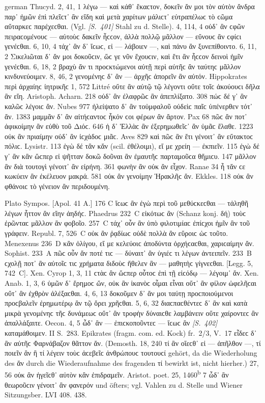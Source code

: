 \begin{otherlanguage*}{german}
Thucyd. 2, 41, 1 λέγω — καὶ κάθ᾽ ἕκαϲτον, δοκεῖν ἄν μοι τὸν αὐτὸν ἄνδρα παρ᾽ ἡμῶν ἐπὶ πλεῖϲτ᾽ ἂν εἴδη καὶ μετὰ χαρίτων μάλιϲτ᾽ εὐτραπέλωϲ τὸ ϲῶμα αὔταρκεϲ παρέχεϲθαι. (Vgl. \hypertarget{p401}{\emph{[S.~401]}}\label{p401} Stahl zu d. Stelle). 4, 114, 4 οὐδ᾽ ἂν ϲφῶν πειραϲομένουϲ — αὐτοὺϲ δακεῖν ἧϲϲον, ἀλλὰ πολλῷ μᾶλλον — εὔνουϲ ἂν ϲφίϲι γενέϲθαι. 6, 10, 4 τάχ᾽ ἂν δ᾽ ἴϲωϲ, εἰ — λάβοιεν —, καὶ πάνυ ἂν ξυνεπίθοιντο. 6, 11, 2 Σικελιῶται δ᾽ ἄν μοι δοκοῦϲιν, ὥϲ γε νῦν ἔχουϲιν, καὶ ἔτι ἂν ἧϲϲον δεινοὶ ἡμῖν γενέϲθαι. 6, 18, 2 βραχὺ ἄν τι προϲκτώμενοι αὐτῇ περὶ αὐτῆϲ ἂν ταύτηϲ μᾶλλον κινδυνεύοιμεν. 8, 46, 2 γενομένηϲ δ᾽ ἂν — ἀρχῆϲ ἀπορεῖν ἂν αὐτόν. Hippokrates περὶ ἀρχαίηϲ ἰητρικῆϲ 1, 572 Littré οὔτε ἂν αὐτῷ τῷ λέγοντι οὔτε τοῖϲ ἀκούουϲι δῆλα ἂν εἴη. Aristoph. Acharn. 218 οὐδ᾽ ἂν ἐλαφρῶϲ ἂν ἀπεπλίξατο. 308 πώϲ δέ γ᾽ ἂν καλῶϲ λέγοιϲ ἄν. Nubes 977 ἠλείψατο δ᾽ ἂν τοὐμφαλοῦ οὐδεὶϲ παῖϲ ὑπένερθεν τότ᾽ ἄν. 1383 μαμμᾶν δ᾽ ἂν αἰτήϲαντοϲ ἧκόν ϲοι φέρων ἂν ἄρτον. Pax 68 πῶϲ ἄν ποτ᾽ ἀφικοίμην ἂν εὐθὺ τοῦ Διόϲ. 646 ἡ δ᾽ Ἑλλὰϲ ἂν ἐξερημωθεῖϲ᾽ ἂν ὑμᾶϲ ἔλαθε. 1223 οὐκ ἂν πριαίμην οὐδ᾽ ἂν ἰϲχάδοϲ μιᾶϲ. Aves 829 καὶ πῶϲ ἂν ἔτι γένοιτ᾽ ἂν εὔτακτοϲ πόλιϲ. Lysistr. 113 ἐγὼ δέ τἂν κἄν (scil. ἐθέλοιμι), εἴ με χρείη — ἐκπιεῖν. 115 ἐγὼ δέ γ᾽ ἂν κἂν ὥϲπερ εἰ ψῆτταν δοκῶ δοῦναι ἂν ἐμαυτῆϲ παρταμοῦϲα θἤμιϲυ. 147 μᾶλλον ἂν διὰ τουτογὶ γένοιτ᾽ ἂν εἰρήνη. 361 φωνὴν ἂν οὐκ ἂν εἶχον. Ranae 34 ἦ τἄν ϲε κωκύειν ἂν ἐκέλευον μακρά. 581 οὐκ ἂν γενοίμην Ἡρακλῆϲ ἄν. Ekkles. 118 οὐκ ἂν φθάνοιϲ τὸ γένειον ἂν περιδουμένη.

Plato Sympos. [Apol. 41 Α.] 176 C ἴϲωϲ ἂν ἐγὼ περὶ τοῦ μεθύϲκεϲθαι — τἀληθῆ λέγων ἧττον ἂν εἴην ἀηδήϲ. Phaedrus 232~C εἰκότωϲ ἂν (Schanz konj. δή) τοὺϲ ἐρῶνταϲ μᾶλλον ἂν φοβοῖο. 257~C τάχ᾽ οὖν ἂν ὑπὸ φιλοτιμίαϲ ἐπίϲχοι ἡμῖν ἂν τοῦ γράφειν. Republ. 7, 526~C οὐκ ἂν ῥᾳδίωϲ οὐδὲ πολλὰ ἂν εὕροιϲ ὡϲ τοῦτο. Menexenus 236~D κἂν ὀλίγου, εἴ με κελεύοιϲ ἀποδύντα ὀρχήϲαϲθαι, χαριϲαίμην ἄν. Sophist. 233~A πῶϲ οὖν ἄν ποτέ τιϲ — δύναιτ᾽ ἂν ὑγιέϲ τι λέγων ἀντειπεῖν. 233~Β ϲχολῇ ποτ᾽ ἂν αὐτοῖϲ τιϲ χρήματα διδοὺϲ ἤθελεν ἂν — μαθητὴϲ γίγνεϲθαι. [Legg. 5, 742~C]. Xen. Cyrop 1, 3, 11 ϲτὰϲ ἂν ὥϲπερ οὗτοϲ ἐπὶ τῇ εἰϲόδῳ — λέγοιμ᾽ ἄν. Xen. Anab. 1, 3, 6 ὑμῶν δ᾽ ἔρημοϲ ὤν, οὐκ ἂν ἱκανὸϲ οἶμαι εἶναι οὔτ᾽ ἂν φίλον ὠφελῆϲαι οὔτ᾽ ἂν ἐχθρὸν ἀλέξαϲθαι. 4, 6, 13 δοκοῦμεν δ᾽ ἄν μοι ταύτῃ προϲποιούμενοι προϲβαλεῖν ἐρημωτέρῳ ἂν τῷ ὄρει χρῆϲθαι. 5, 6, 32 διαϲπαϲθέντεϲ δ᾽ ἂν καὶ κατὰ μικρὰ γενομένηϲ τῆϲ δυνάμεωϲ οὔτ᾽ ἂν τροφὴν δύναιϲθε λαμβάνειν οὔτε χαίροντεϲ ἂν ἀπαλλάξαιτε. Oecon. 4, 5 ὦδ᾽ ἂν — ἐπιϲκοποῦντεϲ — ἴϲωϲ ἂν  \hypertarget{p402}{\emph{[S.~402]}}\label{p402} καταμάθοιμεν. II S.~283. Epikrates (fragm. com. ed. Kock) fr.~2/3, V.~17 εἶδεϲ δ᾽ ἂν αὐτῆϲ Φαρνάβαζον θᾶττον ἄν. (Demosth. 18, 240 τί ἂν οἴεϲθ᾽ εἰ — ἀπῆλθον —, τί ποιεῖν ἂν ἢ τί λέγειν τοὺϲ ἀϲεβεῖϲ ἀνθρώπουϲ τουτουϲί gehört, da die Wiederholung des ἄν durch die Wiederaufnahme des fragenden τί bewirkt ist, nicht hierher.) 27, 56 οὐκ ἂν ἡγεῖϲθ᾽ αὐτὸν κἂν ἐπιδραμεῖν. Aristot. poet. 25, 1460\textsuperscript{b} 7 ὧδ᾽ ἂν θεωροῦϲιν γένοιτ᾽ ἂν φανερόν und öfters; vgl. Vahlen zu d. Stelle und Wiener Sitzungsber. LVI 408. 438.


\end{otherlanguage*}

